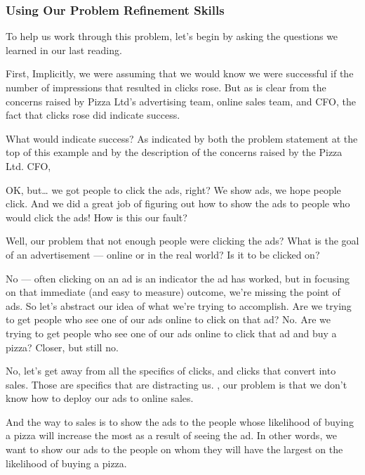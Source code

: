 \documentclass[letterpaper,10pt,english]{jupyterBook}
\begin{document}
\subsubsection{Using Our Problem Refinement Skills}
\label{\detokenize{20_problems_to_questions/15_solving_the_wrong_problem:using-our-problem-refinement-skills}}
\sphinxAtStartPar
To help us work through this problem, let’s begin by asking the questions we learned in our last reading.

\sphinxAtStartPar
First,  Implicitly, we were assuming that we would know we were successful if the number of impressions that resulted in clicks rose. But as is clear from the concerns raised by Pizza Ltd’s advertising team, online sales team, and CFO, the fact that clicks rose did  indicate success.

\sphinxAtStartPar
What would indicate success? As indicated by both the problem statement at the top of this example and by the description of the concerns raised by the Pizza Ltd. CFO, 

\sphinxAtStartPar
OK, but… we got people to click the ads, right? We show ads, we hope people click. And we did a great job of figuring out how to show the ads to people who would click the ads! How is this our fault?

\sphinxAtStartPar
Well,  our problem that not enough people were clicking the ads? What is the goal of an advertisement — online or in the real world? Is it to be clicked on?

\sphinxAtStartPar
No — often clicking on an ad is an indicator the ad has worked, but in focusing on that immediate (and easy to measure) outcome, we’re missing the point of ads. So let’s abstract our idea of what we’re trying to accomplish. Are we trying to get people who see one of our ads online to click on that ad? No. Are we trying to get people who see one of our ads online to click that ad and buy a pizza? Closer, but still no.

\sphinxAtStartPar
No, let’s get away from all the specifics of clicks, and clicks that convert into sales. Those are specifics that are distracting us. , our problem is that we don’t know how to deploy our ads to  online sales.

\sphinxAtStartPar
And the way to  sales is to show the ads to the people whose likelihood of buying a pizza will increase the most as a result of seeing the ad. In other words, we want to show our ads to the people on whom they will have the largest  on the likelihood of buying a pizza.
\end{document}
